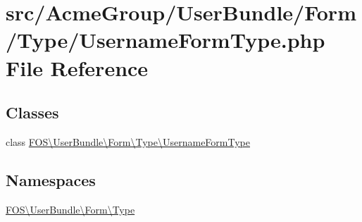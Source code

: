 \hypertarget{_username_form_type_8php}{\section{src/\+Acme\+Group/\+User\+Bundle/\+Form/\+Type/\+Username\+Form\+Type.php File Reference}
\label{_username_form_type_8php}
}
\subsection*{Classes}
\begin{DoxyCompactItemize}
\item 
class \hyperlink{class_f_o_s_1_1_user_bundle_1_1_form_1_1_type_1_1_username_form_type}{F\+O\+S\textbackslash{}\+User\+Bundle\textbackslash{}\+Form\textbackslash{}\+Type\textbackslash{}\+Username\+Form\+Type}
\end{DoxyCompactItemize}
\subsection*{Namespaces}
\begin{DoxyCompactItemize}
\item 
 \hyperlink{namespace_f_o_s_1_1_user_bundle_1_1_form_1_1_type}{F\+O\+S\textbackslash{}\+User\+Bundle\textbackslash{}\+Form\textbackslash{}\+Type}
\end{DoxyCompactItemize}
